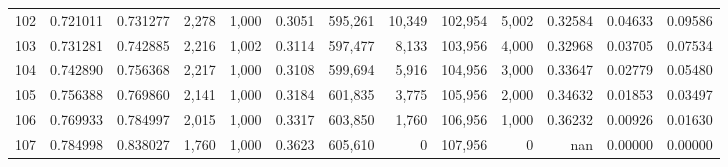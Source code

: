 \begin{tabular}{rrrrrrrrrrrrr}
102 &  0.721011 &  0.731277 &   2,278 &  1,000 &                                     0.3051 &  595,261 &   10,349 &  102,954 &    5,002 &  0.32584 &  0.04633 &  0.09586 \\
103 &  0.731281 &  0.742885 &   2,216 &  1,002 &                                     0.3114 &  597,477 &    8,133 &  103,956 &    4,000 &  0.32968 &  0.03705 &  0.07534 \\
104 &  0.742890 &  0.756368 &   2,217 &  1,000 &                                     0.3108 &  599,694 &    5,916 &  104,956 &    3,000 &  0.33647 &  0.02779 &  0.05480 \\
105 &  0.756388 &  0.769860 &   2,141 &  1,000 &                                     0.3184 &  601,835 &    3,775 &  105,956 &    2,000 &  0.34632 &  0.01853 &  0.03497 \\
106 &  0.769933 &  0.784997 &   2,015 &  1,000 &                                     0.3317 &  603,850 &    1,760 &  106,956 &    1,000 &  0.36232 &  0.00926 &  0.01630 \\
107 &  0.784998 &  0.838027 &   1,760 &  1,000 &                                     0.3623 &  605,610 &        0 &  107,956 &        0 &      nan &  0.00000 &  0.00000 \\
\bottomrule
\end{tabular}
